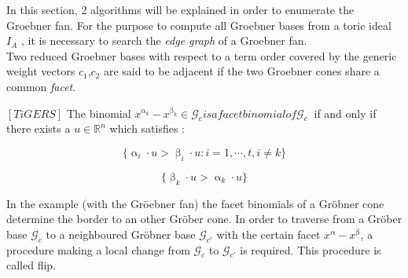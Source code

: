 In this section, 2 algorithms will be explained in order to enumerate the Groebner fan.
For the purpose to compute all Groebner bases from a toric ideal $I_A$ , it is necessary to search the \textit{edge graph} of a Groebner fan.\\
Two reduced Groebner bases with respect to a term order covered by the generic weight vectors $c_{1}$,$c_{2}$ are said to be adjacent if the two Groebner cones share a common \textit{facet}.

\begin{env_definition}
$\left[TiGERS \right]  $ 
The binomial $x^{\upalpha_{k}}-x^{\upbeta_k} \in \mathcal{G}_c is a facet binomial of \mathcal{G}_c~$ if and only if there exists a $u \in \mathbb{R}^{n}$ which satisfies :
\begin{center}
\begin{enumerate}

\end{enumerate}
\item
\[ \lbrace \upalpha_{i} \cdot u > \upbeta_{i} \cdot u : i = 1, \cdots , t, i \neq k \rbrace  
\]
\item
\[ \lbrace \upbeta_{k} \cdot u > \upalpha_{k} \cdot u \rbrace \]

\end{center} 

\end{env_definition}

In the example (with the Gröebner fan) the facet binomials of a Gröbner cone determine the border to an other Gröber cone.
In order to traverse from a Gröber base $\mathcal{G}_c$ to a neighboured Gröbner base $\mathcal{G}_{c'}$ with the certain facet $x^{\upalpha}-x^{\upbeta} $, a procedure making a local change from $\mathcal{G}_c$ to $\mathcal{G}_{c'}$ is required.
This procedure is called flip.

\newpage



